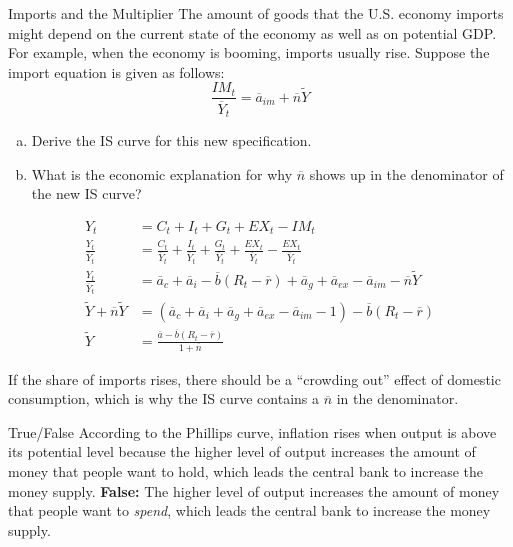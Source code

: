 \documentclass[8pt]{extarticle}
\begin{document}
  \begin{problem}{Imports and the Multiplier}
    The amount of goods that the U.S. economy imports might depend on the current state of the economy as well as on potential GDP. For example, when the economy is booming, imports usually rise. Suppose the import equation is given as follows:
    \[
      \frac{IM_t}{\overline{Y}_t} = \overline{a}_{im} + \overline{n}\tilde{Y}
    \]
    \begin{enumerate}[(a)]
      \item Derive the IS curve for this new specification.
      \item What is the economic explanation for why $\overline{n}$ shows up in the denominator of the new IS curve?
    \end{enumerate}
    \tcblower
    \begin{tcolorbox}[colback = white, title = (a), breakable]
      \begin{align*}
        Y_t &= C_t + I_t + G_t + EX_t - IM_t \\
        \frac{Y_t}{\overline{Y}_t} &= \frac{C_t}{\overline{Y}_t} + \frac{I_t}{\overline{Y}_t} + \frac{G_t}{\overline{Y}_t} + \frac{EX_t}{\overline{Y}_t} - \frac{EX_t}{\overline{Y}_t} \\
        \frac{Y_t}{\overline{Y}_t} &= \overline{a}_c + \overline{a}_i - \overline{b}(R_t - \overline{r}) + \overline{a}_g + \overline{a}_{ex} - \overline{a}_{im} - \overline{n}\tilde{Y} \\
        \tilde{Y} + \overline{n}\tilde{Y}&= \left(\overline{a}_c + \overline{a}_i + \overline{a}_g + \overline{a}_{ex} - \overline{a}_{im}-1\right)- \overline{b}(R_t - \overline{r})  \\
        \tilde{Y} &= \frac{\overline{a} - \overline{b}(R_t - \overline{r})}{1+\overline{n}}
      \end{align*}
    \end{tcolorbox}
    \begin{tcolorbox}[colback = white, title = (b), breakable]
      If the share of imports rises, there should be a ``crowding out'' effect of domestic consumption, which is why the IS curve contains a $\overline{n}$ in the denominator.
    \end{tcolorbox}
  \end{problem}
  \begin{problem}{True/False}
    According to the Phillips curve, inflation rises when output is above its potential level because the higher level of output increases the amount of money that people want to hold, which leads the central bank to increase the money supply.
    \tcblower
    \textbf{False:} The higher level of output increases the amount of money that people want to \textit{spend}, which leads the central bank to increase the money supply.
  \end{problem}
\end{document}
